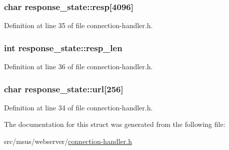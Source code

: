 \hypertarget{structresponse__state_afb106346ba6cd2fbbd890c8ec9540876}{
\subsubsection[{resp}]{\setlength{\rightskip}{0pt plus 5cm}char response\-\_\-state\-::resp\mbox{[}4096\mbox{]}}}\label{structresponse__state_afb106346ba6cd2fbbd890c8ec9540876}


Definition at line 35 of file connection-\/handler.\-h.

\hypertarget{structresponse__state_ae88a2831ab15e9936f7eff929ee907c4}{
\subsubsection[{resp\-\_\-len}]{\setlength{\rightskip}{0pt plus 5cm}int response\-\_\-state\-::resp\-\_\-len}}\label{structresponse__state_ae88a2831ab15e9936f7eff929ee907c4}


Definition at line 36 of file connection-\/handler.\-h.

\hypertarget{structresponse__state_a8f1c401abbed7387d7e60181d0cb2791}{
\subsubsection[{url}]{\setlength{\rightskip}{0pt plus 5cm}char response\-\_\-state\-::url\mbox{[}256\mbox{]}}}\label{structresponse__state_a8f1c401abbed7387d7e60181d0cb2791}


Definition at line 34 of file connection-\/handler.\-h.



The documentation for this struct was generated from the following file\-:\begin{DoxyCompactItemize}
\item 
src/msus/webserver/\hyperlink{connection-handler_8h}{connection-\/handler.\-h}\end{DoxyCompactItemize}
